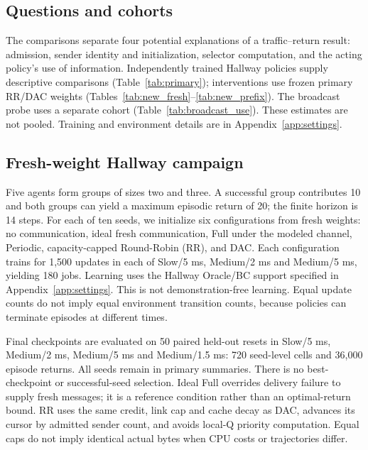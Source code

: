 \documentclass[10pt]{article}
\begin{document}
\subsection{Questions and cohorts}
The comparisons separate four potential explanations of a traffic--return result: admission, sender identity and initialization, selector computation, and the acting policy's use of information. Independently trained Hallway policies supply descriptive comparisons (Table~\ref{tab:primary}); interventions use frozen primary RR/DAC weights (Tables~\ref{tab:new_fresh}--\ref{tab:new_prefix}). The broadcast probe uses a separate cohort (Table~\ref{tab:broadcast_use}). These estimates are not pooled. Training and environment details are in Appendix~\ref{app:settings}.

\newpage
\vspace*{-2.5\baselineskip}\vspace*{-6pt}\vspace*{-7mm}\vspace*{8.8pt}
\subsection{Fresh-weight Hallway campaign}
Five agents form groups of sizes two and three. A successful group contributes 10 and both groups can yield a maximum episodic return of 20; the finite horizon is 14 steps. For each of ten seeds, we initialize six configurations from fresh weights: no communication, ideal fresh communication, Full under the modeled channel, Periodic, capacity-capped Round-Robin (RR), and DAC. Each configuration trains for 1,500 updates in each of Slow/5 ms, Medium/2 ms and Medium/5 ms, yielding 180 jobs. Learning uses the Hallway Oracle/BC support specified in Appendix~\ref{app:settings}. This is not demonstration-free learning. Equal update counts do not imply equal environment transition counts, because policies can terminate episodes at different times.

Final checkpoints are evaluated on 50 paired held-out resets in Slow/5 ms, Medium/2 ms, Medium/5 ms and Medium/1.5 ms: 720 seed-level cells and 36,000 episode returns. All seeds remain in primary summaries. There is no best-checkpoint or successful-seed selection. Ideal Full overrides delivery failure to supply fresh messages; it is a reference condition rather than an optimal-return bound. RR uses the same credit, link cap and cache decay as DAC, advances its cursor by admitted sender count, and avoids local-Q priority computation. Equal caps do not imply identical actual bytes when CPU costs or trajectories differ.
\end{document}
